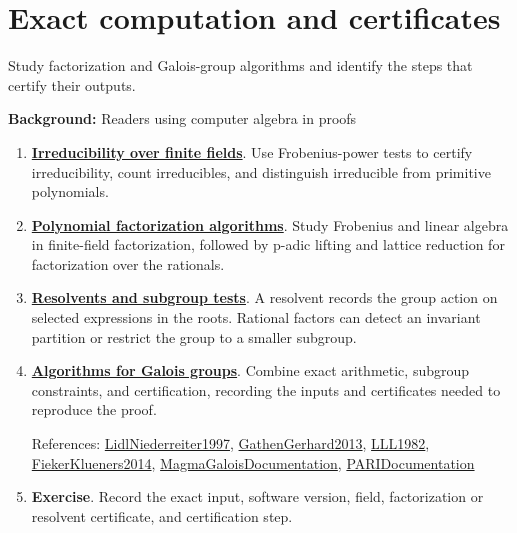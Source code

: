 \documentclass[11pt,a4paper,oneside,openany]{book}
\begin{document}
\section*{Exact computation and certificates}
Study factorization and Galois-group algorithms and identify the steps that certify their outputs.\par
\textbf{Background:} Readers using computer algebra in proofs\par
\begin{enumerate}
\item \textbf{\hyperlink{article:finite-field-irreducibility}{Irreducibility over finite fields}}. Use Frobenius-power tests to certify irreducibility, count irreducibles, and distinguish irreducible from primitive polynomials.\par
\item \textbf{\hyperlink{article:factorization-algorithms}{Polynomial factorization algorithms}}. Study Frobenius and linear algebra in finite-field factorization, followed by p-adic lifting and lattice reduction for factorization over the rationals.\par
\item \textbf{\hyperlink{article:resolvents}{Resolvents and subgroup tests}}. A resolvent records the group action on selected expressions in the roots. Rational factors can detect an invariant partition or restrict the group to a smaller subgroup.\par
\item \textbf{\hyperlink{article:galois-computation}{Algorithms for Galois groups}}. Combine exact arithmetic, subgroup constraints, and certification, recording the inputs and certificates needed to reproduce the proof.\par
{\footnotesize References: \hyperlink{ref:LidlNiederreiter1997}{LidlNiederreiter1997}, \hyperlink{ref:GathenGerhard2013}{GathenGerhard2013}, \hyperlink{ref:LLL1982}{LLL1982}, \hyperlink{ref:FiekerKlueners2014}{FiekerKlueners2014}, \hyperlink{ref:MagmaGaloisDocumentation}{MagmaGaloisDocumentation}, \hyperlink{ref:PARIDocumentation}{PARIDocumentation}}\par
\item \textbf{Exercise}. Record the exact input, software version, field, factorization or resolvent certificate, and certification step.\par
\end{enumerate}
\end{document}
